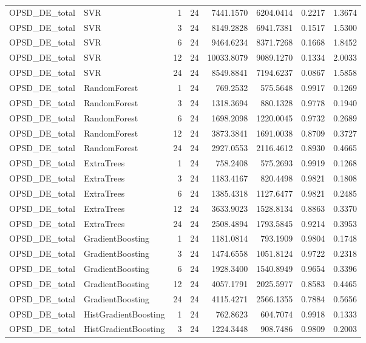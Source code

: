 \begin{tabular}{llrrrrrr}
OPSD_DE_total & SVR & 1 & 24 & 7441.1570 & 6204.0414 & 0.2217 & 1.3674 \\
OPSD_DE_total & SVR & 3 & 24 & 8149.2828 & 6941.7381 & 0.1517 & 1.5300 \\
OPSD_DE_total & SVR & 6 & 24 & 9464.6234 & 8371.7268 & 0.1668 & 1.8452 \\
OPSD_DE_total & SVR & 12 & 24 & 10033.8079 & 9089.1270 & 0.1334 & 2.0033 \\
OPSD_DE_total & SVR & 24 & 24 & 8549.8841 & 7194.6237 & 0.0867 & 1.5858 \\
OPSD_DE_total & RandomForest & 1 & 24 & 769.2532 & 575.5648 & 0.9917 & 0.1269 \\
OPSD_DE_total & RandomForest & 3 & 24 & 1318.3694 & 880.1328 & 0.9778 & 0.1940 \\
OPSD_DE_total & RandomForest & 6 & 24 & 1698.2098 & 1220.0045 & 0.9732 & 0.2689 \\
OPSD_DE_total & RandomForest & 12 & 24 & 3873.3841 & 1691.0038 & 0.8709 & 0.3727 \\
OPSD_DE_total & RandomForest & 24 & 24 & 2927.0553 & 2116.4612 & 0.8930 & 0.4665 \\
OPSD_DE_total & ExtraTrees & 1 & 24 & 758.2408 & 575.2693 & 0.9919 & 0.1268 \\
OPSD_DE_total & ExtraTrees & 3 & 24 & 1183.4167 & 820.4498 & 0.9821 & 0.1808 \\
OPSD_DE_total & ExtraTrees & 6 & 24 & 1385.4318 & 1127.6477 & 0.9821 & 0.2485 \\
OPSD_DE_total & ExtraTrees & 12 & 24 & 3633.9023 & 1528.8134 & 0.8863 & 0.3370 \\
OPSD_DE_total & ExtraTrees & 24 & 24 & 2508.4894 & 1793.5845 & 0.9214 & 0.3953 \\
OPSD_DE_total & GradientBoosting & 1 & 24 & 1181.0814 & 793.1909 & 0.9804 & 0.1748 \\
OPSD_DE_total & GradientBoosting & 3 & 24 & 1474.6558 & 1051.8124 & 0.9722 & 0.2318 \\
OPSD_DE_total & GradientBoosting & 6 & 24 & 1928.3400 & 1540.8949 & 0.9654 & 0.3396 \\
OPSD_DE_total & GradientBoosting & 12 & 24 & 4057.1791 & 2025.5977 & 0.8583 & 0.4465 \\
OPSD_DE_total & GradientBoosting & 24 & 24 & 4115.4271 & 2566.1355 & 0.7884 & 0.5656 \\
OPSD_DE_total & HistGradientBoosting & 1 & 24 & 762.8623 & 604.7074 & 0.9918 & 0.1333 \\
OPSD_DE_total & HistGradientBoosting & 3 & 24 & 1224.3448 & 908.7486 & 0.9809 & 0.2003 \\

\end{tabular}
